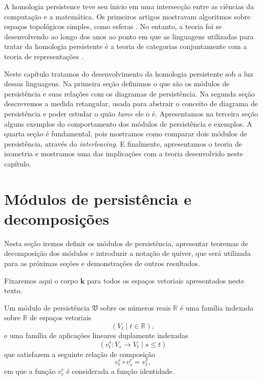 A homologia persistence teve seu ínicio em uma intersecção entre as ciências da computação 
e a matemática. Os primeiros artigos mostravam algoritmos sobre espaços topológicos simples,
como esferas \cite{Edelsbrunner2000}. No entanto, a teoria foi se desenvolvendo 
ao longo dos anos ao ponto em que as linguagens utilizadas para tratar da homologia persistente 
é a teoria de categorias conjuntamente com a teoria de representações \cite{Chazal2016}.

Neste capítulo tratamos do desenvolvimento da homologia persistente sob a luz dessas linguagens. 
Na primeira seção definimos o que são os módulos de persistência e suas relações com os diagramas de 
persistência. Na segunda seção descrevemos a medida retangular, usada para abstrair o conceito 
de diagrama de persistência e poder estudar o quão \textit{tame} ele o é. Apresentamos na terceira seção
alguns exemplos do comportamento dos módulos de persistência e exemplos. A quarta seção é fundamental,
pois mostramos como comparar dois módulos de persistência, através do \textit{interleaving}. E finalmente,
apresentamos o teoria de isometria e mostramos uma das implicações com a teoria desenvolvido neste capítulo. 

\section{Módulos de persistência e decomposições}
Nesta seção iremos definir os módulos de persistência, apresentar teoremas de decomposição dos módulos 
e introduzir a notação de quiver, que será utilizada para as próximas seções e demonstrações de 
outros resultados. 

Fixaremos aqui o corpo $\mathbf{k}$ para todos os espaços vetoriais apresentados neste texto. 

\begin{defi}
    Um módulo de persistência $\mathfrak{V}$ sobre os números reais $\mathbb{R}$ é uma família indexada 
    sobre $\mathbb{R}$ de espaços vetoriais 
    \begin{equation*}
        (V_t \mid t \in \mathbb{R}), 
    \end{equation*} 
    e uma família de aplicações lineares duplamente indexadas
    \begin{equation*}
        (v_t^s \colon V_s \to V_t \mid s \leq t) 
    \end{equation*}
    que satisfazem a seguinte relação de composição
    \begin{equation*}
        v_t^s \circ v_s^r = v_t^r,
    \end{equation*} 
    em que a função $v^r_r$ é considerada a função identidade. 
\end{defi}


